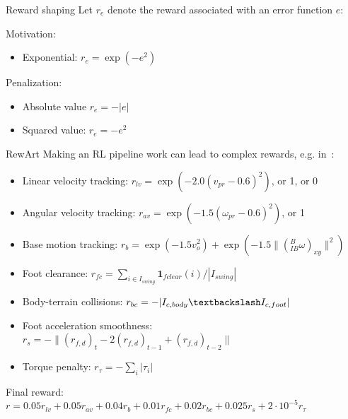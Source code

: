 \documentclass[10pt, aspectratio=1610]{beamer}
\begin{document}
\begin{frame}{Reward shaping}
    Let $r_e$ denote the reward associated with an error function $e$:

    Motivation:
    \begin{itemize}
        \item Exponential: $r_e = \exp(-e^2)$
    \end{itemize}

    Penalization:
    \begin{itemize}
        \item Absolute value $r_e = -|e|$
        \item Squared value: $r_e = -e^2$
    \end{itemize}
\end{frame}

\begin{frame}{RewArt}
    Making an RL pipeline work can lead to complex rewards, e.g. in~\cite{lee2020}:
    \begin{itemize}
        \item Linear velocity tracking: $r_{lv} = \exp(-2.0 (v_{pr} - 0.6)^2)$, or 1, or 0
        \item Angular velocity tracking: $r_{av} = \exp(-1.5 (\omega_{pr} - 0.6)^2)$, or 1
        \item Base motion tracking: $r_b = \exp(-1.5v_o^2) + \exp(-1.5 \|({}^B_{IB} \omega)_{xy}\|^2)$
        \item Foot clearance: $r_{fc} = \sum_{i \in I_{swing}} \mathbf{1}_{fclear}(i) / |I_{swing}|$
        \item Body-terrain collisions: $r_{bc} = -|I_{c,body} \textbackslash I_{c,foot}|$
        \item Foot acceleration smoothness: $r_{s} = -\| (r_{f,d})_t - 2(r_{f,d})_{t-1} + (r_{f,d})_{t-2}\|$
        \item Torque penalty: $r_{\tau} = -\sum_{i} | \tau_i |$
    \end{itemize}
    Final reward: $r = 0.05 r_{lv} + 0.05 r_{av} + 0.04 r_b + 0.01 r_{fc} + 0.02 r_{bc} + 0.025 r_s + 2 \cdot 10^{-5} r_{\tau}$
\end{frame}
\end{document}
